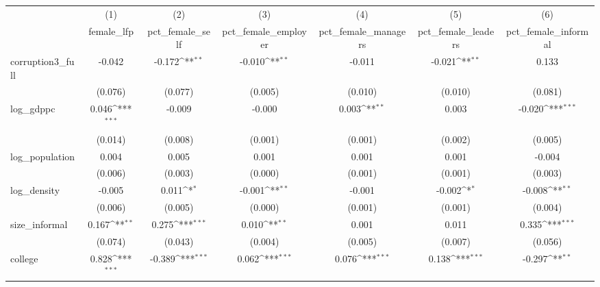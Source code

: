 {
\def\sym#1{\ifmmode^{#1}\else\(^{#1}\)\fi}
\begin{tabular}{l*{6}{c}}
\hline\hline
            &\multicolumn{1}{c}{(1)}&\multicolumn{1}{c}{(2)}&\multicolumn{1}{c}{(3)}&\multicolumn{1}{c}{(4)}&\multicolumn{1}{c}{(5)}&\multicolumn{1}{c}{(6)}\\
            &\multicolumn{1}{c}{female\_lfp}&\multicolumn{1}{c}{pct\_female\_self}&\multicolumn{1}{c}{pct\_female\_employer}&\multicolumn{1}{c}{pct\_female\_managers}&\multicolumn{1}{c}{pct\_female\_leaders}&\multicolumn{1}{c}{pct\_female\_informal}\\
\hline
corruption3\_full&      -0.042         &      -0.172\sym{**} &      -0.010\sym{**} &      -0.011         &      -0.021\sym{**} &       0.133         \\
            &     (0.076)         &     (0.077)         &     (0.005)         &     (0.010)         &     (0.010)         &     (0.081)         \\
[1em]
log\_gdppc   &       0.046\sym{***}&      -0.009         &      -0.000         &       0.003\sym{**} &       0.003         &      -0.020\sym{***}\\
            &     (0.014)         &     (0.008)         &     (0.001)         &     (0.001)         &     (0.002)         &     (0.005)         \\
[1em]
log\_population&       0.004         &       0.005         &       0.001         &       0.001         &       0.001         &      -0.004         \\
            &     (0.006)         &     (0.003)         &     (0.000)         &     (0.001)         &     (0.001)         &     (0.003)         \\
[1em]
log\_density &      -0.005         &       0.011\sym{*}  &      -0.001\sym{**} &      -0.001         &      -0.002\sym{*}  &      -0.008\sym{**} \\
            &     (0.006)         &     (0.005)         &     (0.000)         &     (0.001)         &     (0.001)         &     (0.004)         \\
[1em]
size\_informal&       0.167\sym{**} &       0.275\sym{***}&       0.010\sym{**} &       0.001         &       0.011         &       0.335\sym{***}\\
            &     (0.074)         &     (0.043)         &     (0.004)         &     (0.005)         &     (0.007)         &     (0.056)         \\
[1em]
college     &       0.828\sym{***}&      -0.389\sym{***}&       0.062\sym{***}&       0.076\sym{***}&       0.138\sym{***}&      -0.297\sym{**} \\

\end{tabular}}
